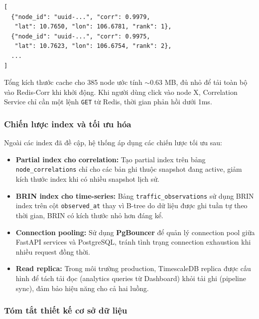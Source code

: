 \begin{verbatim}
[
  {"node_id": "uuid-...", "corr": 0.9979,
   "lat": 10.7650, "lon": 106.6781, "rank": 1},
  {"node_id": "uuid-...", "corr": 0.9975,
   "lat": 10.7623, "lon": 106.6754, "rank": 2},
  ...
]
\end{verbatim}

Tổng kích thước cache cho 385 node ước tính $\sim$0.63 MB, đủ nhỏ để tải toàn bộ vào Redis-Corr khi khởi động. Khi người dùng click vào node X, Correlation Service chỉ cần một lệnh \texttt{GET} từ Redis, thời gian phản hồi dưới 1ms.

\subsubsection{Chiến lược index và tối ưu hóa}

Ngoài các index đã đề cập, hệ thống áp dụng các chiến lược tối ưu sau:

\begin{itemize}
    \item \textbf{Partial index cho correlation:} Tạo partial index trên bảng \texttt{node\_correlations} chỉ cho các bản ghi thuộc snapshot đang active, giảm kích thước index khi có nhiều snapshot lịch sử.
    \item \textbf{BRIN index cho time-series:} Bảng \texttt{traffic\_observations} sử dụng BRIN index trên cột \texttt{observed\_at} thay vì B-tree do dữ liệu được ghi tuần tự theo thời gian, BRIN có kích thước nhỏ hơn đáng kể.
    \item \textbf{Connection pooling:} Sử dụng \textbf{PgBouncer} để quản lý connection pool giữa FastAPI services và PostgreSQL, tránh tình trạng connection exhaustion khi nhiều request đồng thời.
    \item \textbf{Read replica:} Trong môi trường production, TimescaleDB replica được cấu hình để tách tải đọc (analytics queries từ Dashboard) khỏi tải ghi (pipeline sync), đảm bảo hiệu năng cho cả hai luồng.
\end{itemize}

\subsubsection{Tóm tắt thiết kế cơ sở dữ liệu}

